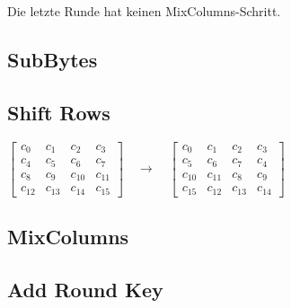 Die letzte Runde hat keinen MixColumns-Schritt.\\

\subsection{SubBytes}

\subsection{Shift Rows}

\noindent
\flushleft
\(
\begin{bmatrix}
c_0  & c_1  & c_2  & c_3  \\
c_4  & c_5  & c_6  & c_7  \\
c_8  & c_9  & c_{10} & c_{11} \\
c_{12} & c_{13} & c_{14} & c_{15}
\end{bmatrix}
\quad \rightarrow \quad
\begin{bmatrix}
c_0  & c_1  & c_2  & c_3  \\
c_5  & c_6  & c_7  & c_4  \\
c_{10} & c_{11} & c_8  & c_9  \\
c_{15} & c_{12} & c_{13} & c_{14}
\end{bmatrix}
\)
\flushleft
\subsection{MixColumns}
\subsection{Add Round Key}
